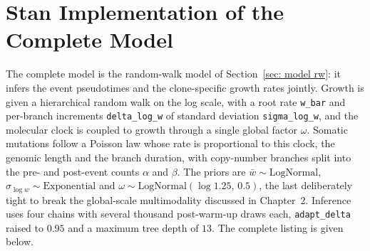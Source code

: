 \section{Stan Implementation of the Complete Model}
\label{app: STAN 2}

The complete model is the random-walk model of Section~\ref{sec: model rw}: it infers
the event pseudotimes and the clone-specific growth rates jointly. Growth is given a
hierarchical random walk on the log scale, with a root rate \texttt{w\_bar} and
per-branch increments \texttt{delta\_log\_w} of standard deviation
\texttt{sigma\_log\_w}, and the molecular clock is coupled to growth through a single
global factor $\omega$. Somatic mutations follow a Poisson law whose rate is
proportional to this clock, the genomic length and the branch duration, with
copy-number branches split into the pre- and post-event counts $\alpha$ and $\beta$.
The priors are $\bar w\sim\mathrm{LogNormal}$, $\sigma_{\log w}\sim\mathrm{Exponential}$
and $\omega\sim\mathrm{LogNormal}(\log 1.25,\,0.5)$, the last deliberately tight to
break the global-scale multimodality discussed in Chapter~2. Inference uses four
chains with several thousand post-warm-up draws each, \texttt{adapt\_delta} raised to
$0.95$ and a maximum tree depth of $13$. The complete listing is given below.


